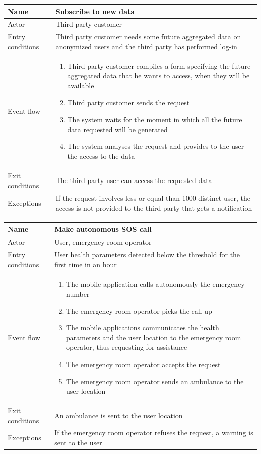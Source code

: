\begin{table}[H]
\begin{tabularx}{\textwidth}{|l|X|}
\hline
 Name & Subscribe to new data \\ \hline
 Actor & Third party customer  \\ \hline
 Entry conditions & Third party customer needs some future aggregated data on anonymized users and the third party has performed log-in \\ \hline
 Event flow & 
 \begin{enumerate}
 	\item Third party customer compiles a form specifying the future aggregated data that he wants to access, when they will be available
 	\item Third party customer sends the request
 	\item The system waits for the moment in which all the future data requested will be generated 
 	\item The system analyses the request and provides to the user the access to the data 
 \end{enumerate}   \\ \hline
 Exit conditions & The third party user can access the requested data \\ \hline
 Exceptions & If the request involves less or equal than 1000 distinct user, the access is not provided to the third party that gets a notification \\ \hline
\end{tabularx}
\end{table}

\begin{table}[H]
\begin{tabularx}{\textwidth}{|l|X|}
\hline
 Name & Make autonomous SOS call \\ \hline
 Actor & User, emergency room operator \\ \hline
 Entry conditions & User health parameters detected below the threshold for the first time in an hour \\ \hline
 Event flow & 
 \begin{enumerate}
 	\item The mobile application calls autonomously the emergency number 
 	\item The emergency room operator picks the call up 
 	\item The mobile applications communicates the health parameters and the user location to the emergency room operator, thus requesting for assistance 
 	\item The emergency room operator accepts the request
 	\item The emergency room operator sends an ambulance to the user location
 \end{enumerate}   \\ \hline
 Exit conditions & An ambulance is sent to the user location \\ \hline
 Exceptions & If the emergency room operator refuses the request, a warning is sent to the user \\ \hline
\end{tabularx}
\end{table}

